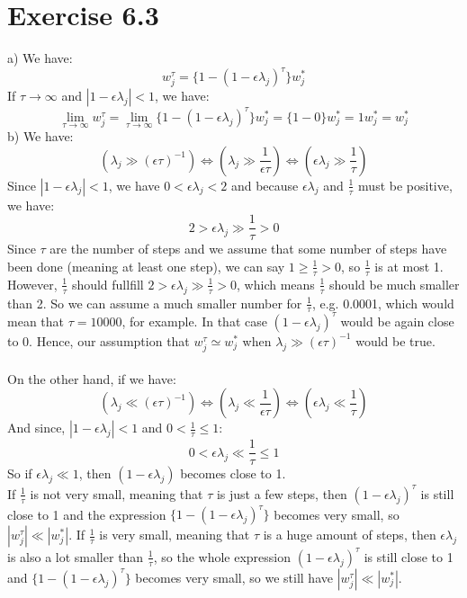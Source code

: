 \documentclass{article}
\begin{document}
\section*{Exercise 6.3}
a) We have:
$$w_j^\tau = \{1 - (1 - \epsilon \lambda_j)^\tau\} w_j^* $$
If $\tau \to \infty$ and $|1 - \epsilon \lambda_j| < 1$, we have:
$$\lim_{\tau \to \infty} w_j^\tau = \lim_{\tau \to \infty}  \{1 - (1 - \epsilon \lambda_j)^\tau\} w_j^* = \{1 - 0\} w^*_j = 1 w^*_j = w^*_j$$
b) We have:
$$\left(\lambda_j \gg (\epsilon \tau)^{-1}\right) \Leftrightarrow \left(\lambda_j \gg \frac{1}{\epsilon \tau}\right) \Leftrightarrow \left(\epsilon \lambda_j \gg \frac{1}{\tau}\right)$$
Since $|1 - \epsilon \lambda_j| < 1$, we have $0 < \epsilon \lambda_j < 2$ and because $\epsilon \lambda_j$ and $\frac{1}{\tau}$ must be positive, we have:
$$2 > \epsilon \lambda_j \gg \frac{1}{\tau} > 0$$
Since $\tau$ are the number of steps and we assume that some number of steps have been done (meaning at least one step), we can say $1 \geq \frac{1}{\tau} > 0$, so $\frac{1}{\tau}$ is at most 1. However, $\frac{1}{\tau}$ should fullfill $2 > \epsilon \lambda_j \gg \frac{1}{\tau} > 0$, which means $\frac{1}{\tau}$ should be much smaller than 2. So we can assume a much smaller number for $\frac{1}{\tau}$, e.g. 0.0001, which would mean that $\tau = 10000$, for example. In that case $(1 - \epsilon \lambda_j)^\tau$ would be again close to 0. Hence, our assumption that $w_j^\tau \simeq w_j^*$ when $\lambda_j \gg (\epsilon \tau)^{-1}$ would be true.\\
\\
On the other hand, if we have:
$$\left(\lambda_j \ll (\epsilon \tau)^{-1}\right) \Leftrightarrow \left(\lambda_j \ll \frac{1}{\epsilon \tau}\right) \Leftrightarrow \left(\epsilon \lambda_j \ll \frac{1}{\tau}\right)$$
And since, $|1 - \epsilon \lambda_j| < 1$ and $0 < \frac{1}{\tau} \leq 1$:
$$0 < \epsilon \lambda_j \ll \frac{1}{\tau} \leq 1$$
So if $\epsilon \lambda_j \ll 1$, then $(1 - \epsilon \lambda_j)$ becomes close to 1.\\
If $\frac{1}{\tau}$ is not very small, meaning that $\tau$ is just a few steps, then $(1 - \epsilon \lambda_j)^\tau$ is still close to 1 and the expression $\{1 - (1 - \epsilon \lambda_j)^\tau\}$ becomes very small, so $|w_j^\tau| \ll |w_j^*|$. If $\frac{1}{\tau}$ is very small, meaning that $\tau$ is a huge amount of steps, then $\epsilon \lambda_j$ is also a lot smaller than $\frac{1}{\tau}$, so the whole expression $(1 - \epsilon \lambda_j)^\tau$ is still close to 1 and $\{1 - (1 - \epsilon \lambda_j)^\tau\}$ becomes very small, so we still have $|w_j^\tau| \ll |w_j^*|$.\\
\end{document}
